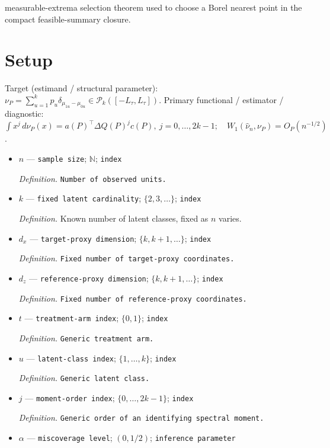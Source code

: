 \documentclass{article}
\begin{document}
measurable-extrema selection theorem used to choose a Borel nearest point in the compact feasible-summary closure.

\section{Setup}

Target (estimand / structural parameter): \(\nu_P=\sum_{u=1}^{k}p_u\delta_{\mu_{1u}-\mu_{0u}}\in\mathcal P_k([-L_{\tau},L_{\tau}])\).
Primary functional / estimator / diagnostic: \(\int x^j\,d\nu_P(x)=a(P)^\top\Delta Q(P)^jc(P),\ j=0,\ldots,2k-1;\quad W_1(\widehat\nu_n,\nu_P)=O_P(n^{-1/2})\).
\begin{itemize}
  \item \(n\) --- \texttt{sample size}; \(\mathbb N\); \texttt{index}
  \par\smallskip\noindent\emph{Definition.} \texttt{Number of observed units.}
  \item \(k\) --- \texttt{fixed latent cardinality}; \(\{2,3,\ldots\}\); \texttt{index}
  \par\smallskip\noindent\emph{Definition.} Known number of latent classes, fixed as \(n\) varies.
  \item \(d_x\) --- \texttt{target-\allowbreak{}proxy dimension}; \(\{k,k+1,\ldots\}\); \texttt{index}
  \par\smallskip\noindent\emph{Definition.} \texttt{Fixed number of target-\allowbreak{}proxy coordinates.}
  \item \(d_z\) --- \texttt{reference-\allowbreak{}proxy dimension}; \(\{k,k+1,\ldots\}\); \texttt{index}
  \par\smallskip\noindent\emph{Definition.} \texttt{Fixed number of reference-\allowbreak{}proxy coordinates.}
  \item \(t\) --- \texttt{treatment-\allowbreak{}arm index}; \(\{0,1\}\); \texttt{index}
  \par\smallskip\noindent\emph{Definition.} \texttt{Generic treatment arm.}
  \item \(u\) --- \texttt{latent-\allowbreak{}class index}; \(\{1,\ldots,k\}\); \texttt{index}
  \par\smallskip\noindent\emph{Definition.} \texttt{Generic latent class.}
  \item \(j\) --- \texttt{moment-\allowbreak{}order index}; \(\{0,\ldots,2k-1\}\); \texttt{index}
  \par\smallskip\noindent\emph{Definition.} \texttt{Generic order of an identifying spectral moment.}
  \item \(\alpha\) --- \texttt{miscoverage level}; \((0,1/2)\); \texttt{inference parameter}

\end{itemize}
\end{document}
